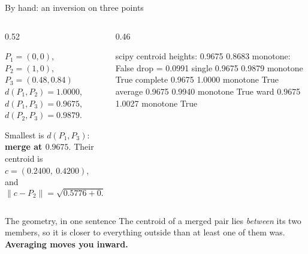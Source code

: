 \documentclass[aspectratio=169]{beamer}
\begin{document}
\begin{frame}[fragile,shrink=5]{By hand: an inversion on three points}
  \begin{columns}[T]
    \begin{column}{0.52\textwidth}
      \begin{block}{$P_1 = (0,0)$, $P_2 = (1,0)$, $P_3 = (0.48, 0.84)$}
        \small
        $d(P_1,P_2) = 1.0000$, \quad $d(P_1,P_3) = 0.9675$, \quad
        $d(P_2,P_3) = 0.9879$.
        \medskip

        Smallest is $d(P_1,P_3)$: \textbf{merge at $0.9675$}.
        Their centroid is $c = (0.2400,\ 0.4200)$, and
        \[
          \lVert c - P_2\rVert = \sqrt{0.5776 + 0.1764} = \sqrt{0.7540}
          = \mathbf{0.8683}.
        \]
      \end{block}
    \end{column}
    \begin{column}{0.46\textwidth}
\begin{outblk}
scipy centroid heights: 0.9675 0.8683
monotone: False   drop = 0.0991
  single    0.9675 0.9879  monotone True
  complete  0.9675 1.0000  monotone True
  average   0.9675 0.9940  monotone True
  ward      0.9675 1.0027  monotone True
\end{outblk}
    \end{column}
  \end{columns}
  \vspace{0.3em}
  \begin{alertblock}{The geometry, in one sentence}
    \centering
    The centroid of a merged pair lies \emph{between} its two members, so it
    is closer to everything outside than at least one of them was.
    \textbf{Averaging moves you inward.}
  \end{alertblock}
\end{frame}
\end{document}
